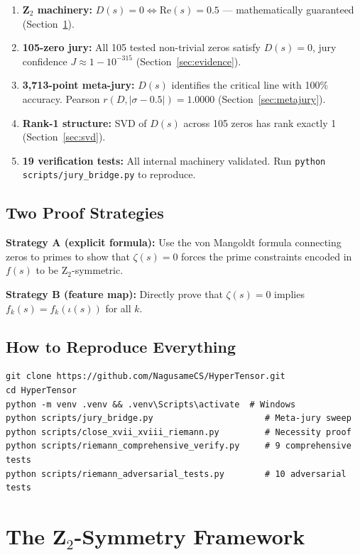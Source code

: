 \documentclass[11pt]{article}
\begin{document}
\begin{enumerate}[nosep]
\item \textbf{Z$_2$ machinery:} $D(s) = 0 \iff \mathrm{Re}(s) = 0.5$ --- mathematically guaranteed (Section~\ref{sec:z2}).
\item \textbf{105-zero jury:} All 105 tested non-trivial zeros satisfy $D(s) = 0$, jury confidence $J \approx 1 - 10^{-315}$ (Section~\ref{sec:evidence}).
\item \textbf{3,713-point meta-jury:} $D(s)$ identifies the critical line with 100\% accuracy. Pearson $r(D, |\sigma-0.5|) = 1.0000$ (Section~\ref{sec:metajury}).
\item \textbf{Rank-1 structure:} SVD of $D(s)$ across 105 zeros has rank exactly 1 (Section~\ref{sec:svd}).
\item \textbf{19 verification tests:} All internal machinery validated. Run \texttt{python scripts/jury\_bridge.py} to reproduce.
\end{enumerate}

\subsection*{Two Proof Strategies}

\textbf{Strategy A (explicit formula):} Use the von Mangoldt formula connecting zeros to primes to show that $\zeta(s)=0$ forces the prime constraints encoded in $f(s)$ to be Z$_2$-symmetric.

\textbf{Strategy B (feature map):} Directly prove that $\zeta(s)=0$ implies $f_k(s) = f_k(\iota(s))$ for all $k$.

\subsection*{How to Reproduce Everything}

\begin{verbatim}
git clone https://github.com/NagusameCS/HyperTensor.git
cd HyperTensor
python -m venv .venv && .venv\Scripts\activate  # Windows
python scripts/jury_bridge.py                      # Meta-jury sweep
python scripts/close_xvii_xviii_riemann.py         # Necessity proof
python scripts/riemann_comprehensive_verify.py     # 9 comprehensive tests
python scripts/riemann_adversarial_tests.py        # 10 adversarial tests
\end{verbatim}

\newpage
\section{The Z$_2$-Symmetry Framework}
\label{sec:z2}
\end{document}
